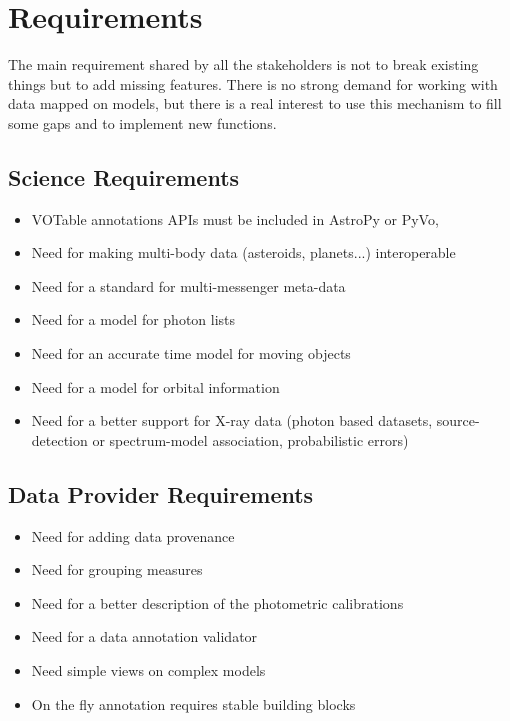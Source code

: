 \documentclass[11pt,a4paper]{ivoa}
\begin{document}
\section{Requirements}

The main requirement shared by all the stakeholders is not to break existing things but to add missing features.
There is no strong demand for working with data mapped on models, but there is a real interest to use this mechanism 
to fill some gaps and to implement new functions.

\subsection{Science Requirements}

\begin{itemize}
\item VOTable annotations APIs must be included in AstroPy or PyVo,
\item Need for making multi-body data (asteroids, planets...) interoperable
\item Need for a standard for multi-messenger meta-data
\item Need for a model for photon lists
\item Need for an accurate time model for moving objects
\item Need for a model for orbital information
\item Need for a better support for X-ray data (photon based datasets, source-detection or spectrum-model association, probabilistic errors)
\end{itemize}

\subsection{Data Provider Requirements}

\begin{itemize}
\item Need for adding data provenance
\item Need for grouping measures
\item Need for a better description of the photometric calibrations
\item Need for a data annotation validator
\item Need simple views on complex models
\item On the fly annotation requires stable building blocks
\end{itemize}
\end{document}
